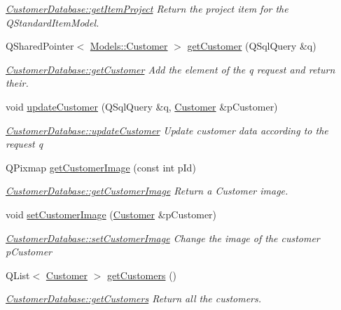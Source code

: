 \begin{DoxyCompactItemize}
\begin{DoxyCompactList}\small\item\em \hyperlink{classDatabases_1_1CustomerDatabase_a641001509d0385000b5b831c134c78c4}{Customer\-Database\-::get\-Item\-Project} Return the project item for the Q\-Standard\-Item\-Model. \end{DoxyCompactList}\item 
Q\-Shared\-Pointer$<$ \hyperlink{classModels_1_1Customer}{Models\-::\-Customer} $>$ \hyperlink{classDatabases_1_1CustomerDatabase_a23017b6db7808fa1d03e55e063418670}{get\-Customer} (Q\-Sql\-Query \&q)
\begin{DoxyCompactList}\small\item\em \hyperlink{classDatabases_1_1CustomerDatabase_ab0544439382fb6891cd7d27f67cb120c}{Customer\-Database\-::get\-Customer} Add the element of the {\itshape q} request and return their. \end{DoxyCompactList}\item 
void \hyperlink{classDatabases_1_1CustomerDatabase_aedb0c575bd9141547e4e084fd260beb7}{update\-Customer} (Q\-Sql\-Query \&q, \hyperlink{classModels_1_1Customer}{Customer} \&p\-Customer)
\begin{DoxyCompactList}\small\item\em \hyperlink{classDatabases_1_1CustomerDatabase_a83493698214a2e8e68024d007e715f35}{Customer\-Database\-::update\-Customer} Update customer data according to the request {\itshape q} \end{DoxyCompactList}\item 
Q\-Pixmap \hyperlink{classDatabases_1_1CustomerDatabase_a72bdc84a12118a12030c3e3770a2ebf9}{get\-Customer\-Image} (const int p\-Id)
\begin{DoxyCompactList}\small\item\em \hyperlink{classDatabases_1_1CustomerDatabase_a72bdc84a12118a12030c3e3770a2ebf9}{Customer\-Database\-::get\-Customer\-Image} Return a Customer image. \end{DoxyCompactList}\item 
void \hyperlink{classDatabases_1_1CustomerDatabase_aa06b3a548c5ac7fba9f21e1f21a3e6e2}{set\-Customer\-Image} (\hyperlink{classModels_1_1Customer}{Customer} \&p\-Customer)
\begin{DoxyCompactList}\small\item\em \hyperlink{classDatabases_1_1CustomerDatabase_aa06b3a548c5ac7fba9f21e1f21a3e6e2}{Customer\-Database\-::set\-Customer\-Image} Change the image of the customer {\itshape p\-Customer} \end{DoxyCompactList}\item 
Q\-List$<$ \hyperlink{classModels_1_1Customer}{Customer} $>$ \hyperlink{classDatabases_1_1CustomerDatabase_aecb30e5fc92b73a43fc99c799e8ba964}{get\-Customers} ()
\begin{DoxyCompactList}\small\item\em \hyperlink{classDatabases_1_1CustomerDatabase_aecb30e5fc92b73a43fc99c799e8ba964}{Customer\-Database\-::get\-Customers} Return all the customers. \end{DoxyCompactList}\end{DoxyCompactItemize}
